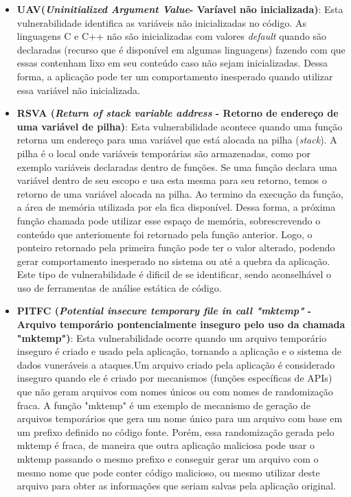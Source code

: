 \begin{itemize}
\item \textbf{UAV(\emph{Uninitialized Argument Value}- Varíavel não inicializada)}: Esta vulnerabilidade identifica as variáveis não inicializadas no código. As linguagens C e C++ não são inicializadas com valores \emph{default} quando são declaradas (recurso que é disponível em algumas linguagens) fazendo com que essas contenham lixo em seu conteúdo caso não sejam inicializadas. Dessa forma, a aplicação pode ter um comportamento inesperado quando utilizar essa variável não inicializada.

%

\item \textbf{ RSVA (\emph{Return of stack variable address} - Retorno de endereço de uma variável de pilha)}: Esta vulnerabilidade acontece quando uma função retorna um endereço para uma variável que está alocada na pilha (\emph{stack}). A pilha é o local onde variáveis temporárias são armazenadas, como por exemplo variáveis declaradas dentro de funções. Se uma função declara uma variável dentro de seu escopo e usa esta mesma para seu retorno, temos o retorno de uma variável alocada na pilha. Ao termino da execução da função, a área de memória utilizada por ela fica disponível. Dessa forma, a próxima função chamada pode utilizar esse espaço de memória, sobrescrevendo o conteúdo que anteriomente foi retornado pela função anterior. Logo, o ponteiro retornado pela primeira função pode ter o valor alterado, podendo gerar comportamento inesperado no sistema ou até a quebra da aplicação. Este tipo de vulnerabilidade é dificil de se identificar, sendo aconselhável o uso de ferramentas de análise estática de código.

%

\item \textbf{PITFC (\emph{Potential insecure temporary file in call "mktemp" } - Arquivo temporário pontencialmente inseguro pelo uso da chamada "mktemp")}: Esta vulnerabilidade ocorre quando um arquivo temporário inseguro é criado e usado pela aplicação, tornando a aplicação e o sistema de dados vuneráveis a ataques.Um arquivo criado pela aplicação é considerado inseguro quando ele é criado por mecanismos (funções específicas de APIs) que não geram arquivos com nomes únicos ou com nomes de randomização fraca. A função "mktemp" é um exemplo de mecanismo de geração de arquivos temporários que gera um nome único para um arquivo com base em um prefixo definido no código fonte. Porém, essa randomização gerada pelo mktemp é fraca, de maneira que outra aplicação maliciosa pode usar o mktemp passando o mesmo prefixo e conseguir gerar um arquivo com o mesmo nome que pode conter código malicioso, ou mesmo utilizar deste arquivo para obter as informações que seriam salvas pela aplicação original.


\end{itemize}
